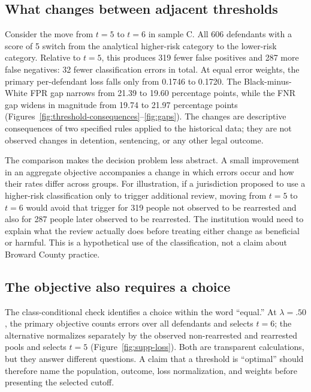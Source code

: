 \documentclass[11pt,letterpaper]{article}
\begin{document}
\subsection{What changes between adjacent thresholds}

Consider the move from $t=5$ to $t=6$ in sample C. All 606 defendants with a score of 5 switch from the analytical higher-risk category to the lower-risk category. Relative to $t=5$, this produces 319 fewer false positives and 287 more false negatives: 32 fewer classification errors in total. At equal error weights, the primary per-defendant loss falls only from 0.1746 to 0.1720. The Black-minus-White FPR gap narrows from 21.39 to 19.60 percentage points, while the FNR gap widens in magnitude from 19.74 to 21.97 percentage points (Figures~\ref{fig:threshold-consequences}--\ref{fig:gaps}). The changes are descriptive consequences of two specified rules applied to the historical data; they are not observed changes in detention, sentencing, or any other legal outcome.

The comparison makes the decision problem less abstract. A small improvement in an aggregate objective accompanies a change in which errors occur and how their rates differ across groups. For illustration, if a jurisdiction proposed to use a higher-risk classification only to trigger additional review, moving from $t=5$ to $t=6$ would avoid that trigger for 319 people not observed to be rearrested and also for 287 people later observed to be rearrested. The institution would need to explain what the review actually does before treating either change as beneficial or harmful. This is a hypothetical use of the classification, not a claim about Broward County practice.

\subsection{The objective also requires a choice}

The class-conditional check identifies a choice within the word ``equal.'' At $\lambda=.50$, the primary objective counts errors over all defendants and selects $t=6$; the alternative normalizes separately by the observed non-rearrested and rearrested pools and selects $t=5$ (Figure~\ref{fig:supp-loss}). Both are transparent calculations, but they answer different questions. A claim that a threshold is ``optimal'' should therefore name the population, outcome, loss normalization, and weights before presenting the selected cutoff.
\end{document}
